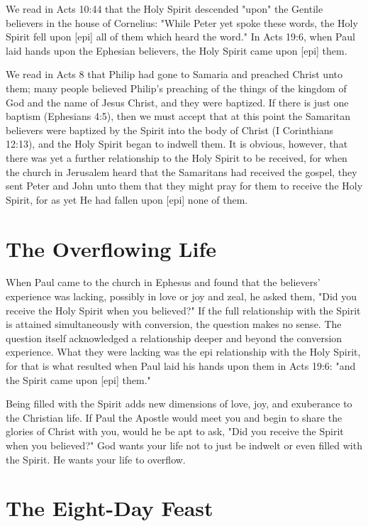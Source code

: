 We read in Acts 10:44 that the Holy Spirit descended "upon" the Gentile believers in the house of Cornelius: "While Peter yet spoke these words, the Holy Spirit fell upon [epi] all of them which heard the word." In Acts 19:6, when Paul laid hands upon the Ephesian believers, the Holy Spirit came upon [epi] them. 

We read in Acts 8 that Philip had gone to Samaria and preached Christ unto them; many people believed Philip's preaching of the things of the kingdom of God and the name of Jesus Christ, and they were baptized. If there is just one baptism (Ephesians 4:5), then we must accept that at this point the Samaritan believers were baptized by the Spirit into the body of Christ (I Corinthians 12:13), and the Holy Spirit began to indwell them. It is obvious, however, that there was yet a further relationship to the Holy Spirit to be received, for when the church in Jerusalem heard that the Samaritans had received the gospel, they sent Peter and John unto them that they might pray for them to receive the Holy Spirit, for as yet He had fallen upon [epi] none of them. 

\section*{The Overflowing Life}

When Paul came to the church in Ephesus and found that the believers' experience was lacking, possibly in love or joy and zeal, he asked them, "Did you receive the Holy Spirit when you believed?" If the full relationship with the Spirit is attained simultaneously with conversion, the question makes no sense. The question itself acknowledged a relationship deeper and beyond the conversion experience. What they were lacking was the epi relationship with the Holy Spirit, for that is what resulted when Paul laid his hands upon them in Acts 19:6: "and the Spirit came upon [epi] them." 

Being filled with the Spirit adds new dimensions of love, joy, and exuberance to the Christian life. If Paul the Apostle would meet you and begin to share the glories of Christ with you, would he be apt to ask, "Did you receive the Spirit when you believed?" God wants your life not to just be indwelt or even filled with the Spirit. He wants your life to overflow. 

\section*{The Eight-Day Feast}


